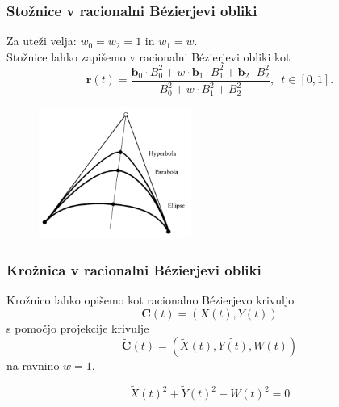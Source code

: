 \documentclass[a4paper, 12pt]{beamer}
\theoremstyle{definition}
\theoremstyle{plain}
\begin{document}
\begin{frame}
\frametitle{Stožnice v racionalni B\'ezierjevi obliki}

    Za uteži velja: $ w_0 = w_2 = 1$ in $w_1 = w$.
    \\
    Stožnice lahko zapišemo v racionalni B\'ezierjevi obliki kot 
    $$\boldsymbol{r}(t)=\frac{\boldsymbol{b}_0\cdot B_0^2+w\cdot\boldsymbol{b}_1\cdot B_1^2+\boldsymbol{b}_2\cdot B_2^2}{ B_0^2+w\cdot B_1^2+ B_2^2},\,\,\, t\in[0,1].$$

    \begin{figure}[ht!]
        \centering
        \includegraphics[width=50mm]{tri_oblike.png}
    \end{figure}
\end{frame}



\begin{frame}
\frametitle{Krožnica v racionalni B\'ezierjevi obliki}

Krožnico lahko opišemo kot racionalno B\'ezierjevo krivuljo 
$$\boldsymbol{C}(t)=(X(t),Y(t))$$ 
s pomočjo projekcije krivulje 
$$\boldsymbol{\tilde{C}}(t)=(\tilde{X}(t), \tilde{Y(t)}, W(t))$$ 
na ravnino $w=1$. 

$$\tilde{X}(t)^2+\tilde{Y}(t)^2-W(t)^2=0$$

\end{frame}


\end{document}

